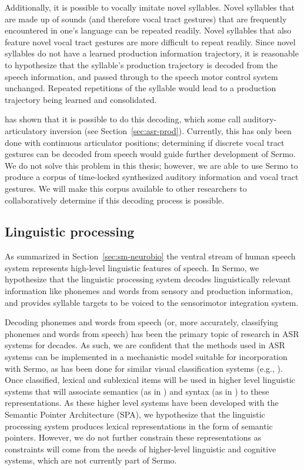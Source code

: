 Additionally,
it is possible to vocally imitate
novel syllables.
Novel syllables that are made up of sounds
(and therefore vocal tract gestures)
that are frequently encountered
in one's language can be
repeated readily.
Novel syllables that also feature
novel vocal tract gestures
are more difficult to repeat readily.
Since novel syllables do not have
a learned production information trajectory,
it is reasonable to hypothesize that
the syllable's production trajectory
is decoded from the speech information,
and passed through to the
speech motor control system unchanged.
Repeated repetitions of the syllable
would lead to a production trajectory
being learned and consolidated.

\citet{uria2011} has shown that it is possible to
do this decoding,
which some call auditory-articulatory inversion
(see Section~\ref{sec:asr-prod}).
Currently, this has only been done
with continuous articulator positions;
determining if discrete vocal tract gestures
can be decoded from speech
would guide further development of Sermo.
We do not solve this problem
in this thesis;
however, we are able to use Sermo
to produce a corpus of time-locked
synthesized auditory information
and vocal tract gestures.
We will make this corpus available
to other researchers
to collaboratively determine
if this decoding process is possible.

\subsection{Linguistic processing}

As summarized in Section~\ref{sec:sm-neurobio}
the ventral stream of human speech system
represents high-level linguistic features of speech.
In Sermo, we hypothesize that
the linguistic processing system
decodes linguistically relevant information
like phonemes and words
from sensory and production information,
and provides syllable targets
to be voiced to the sensorimotor integration system.

Decoding phonemes and words from speech
(or, more accurately,
classifying phonemes and words from speech)
has been the primary topic of research
in ASR systems for decades.
As such, we are confident that
the methods used in ASR systems
can be implemented in a mechanistic model
suitable for incorporation with Sermo,
as has been done for similar
visual classification systems
(e.g., \citealt{hunsberger2013}).
Once classified, lexical and sublexical items
will be used in higher level linguistic
systems that will associate
semantics (as in \citealt{blouw2013,blouw2015})
and syntax (as in \citealt{stewart2014,stewart2015})
to these representations.
As these higher level systems
have been developed with
the Semantic Pointer Architecture (SPA),
we hypothesize that the linguistic processing system
produces lexical representations
in the form of semantic pointers.
However, we do not further constrain these representations
as constraints will come from the needs of
higher-level linguistic and cognitive systems,
which are not currently part of Sermo.

